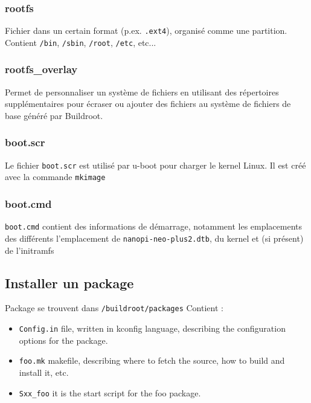 \subsubsection{rootfs}
Fichier dans un certain format (p.ex. \verb+.ext4+), organisé comme une partition.
Contient \verb!/bin!, \verb!/sbin!, \verb!/root!, \verb!/etc!, etc...
\subsubsection{rootfs\_overlay}
Permet de personnaliser un système de fichiers en utilisant des répertoires supplémentaires pour écraser ou ajouter des fichiers au système de fichiers de base généré par Buildroot.
\subsubsection{boot.scr}
Le fichier \verb!boot.scr! est utilisé par u-boot pour charger le kernel Linux. Il est créé avec la commande \verb!mkimage!
\subsubsection{boot.cmd}
\verb!boot.cmd! contient des informations de démarrage, notamment les emplacements des différents l'emplacement de \verb!nanopi-neo-plus2.dtb!, du kernel et (si présent) de l'initramfs

\subsection{Installer un package}
Package se trouvent dans \verb+/buildroot/packages+
Contient :
\begin{itemize}
    \item \verb+Config.in+ file, written in kconfig language, describing the configuration options for the package.
    \item \verb+foo.mk+ makefile, describing where to fetch the source, how to build and install it, etc.
    \item \verb+Sxx_foo+ it is the start script for the foo package.
\end{itemize}
